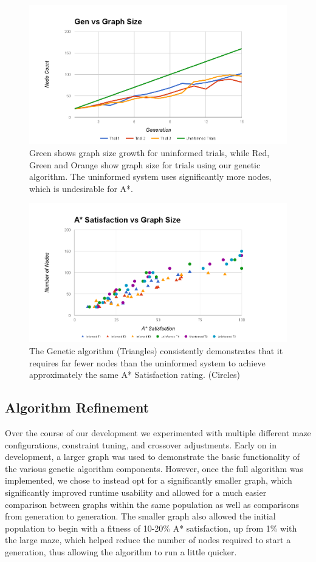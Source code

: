 	\begin{figure}
		\includegraphics[width=\textwidth]{tests/gengraphsize}
		\caption{Green shows graph size growth for uninformed trials, while Red, Green and Orange show graph size for trials using our genetic algorithm. The uninformed system uses significantly more nodes, which is undesirable for A*.}
	\end{figure}
	
	\begin{figure}
		\includegraphics[width=\textwidth]{tests/satgraphsize}
		\caption{The Genetic algorithm (Triangles) consistently demonstrates that it requires far fewer nodes than the uninformed system to achieve approximately the same A* Satisfaction rating. (Circles)}
	\end{figure}
	
	\subsection{Algorithm Refinement}
	Over the course of our development we experimented with multiple different maze configurations, constraint tuning, and crossover adjustments. Early on in development, a larger graph was used to demonstrate the basic functionality of the various genetic algorithm components. However, once the full algorithm was implemented, we chose to instead opt for a significantly smaller graph, which significantly improved runtime usability and allowed for a much easier comparison between graphs within the same population as well as comparisons from generation to generation. The smaller graph also allowed the initial population to begin with a fitness of 10-20\% A* satisfaction, up from 1\% with the large maze, which helped reduce the number of nodes required to start a generation, thus allowing the algorithm to run a little quicker.
	
